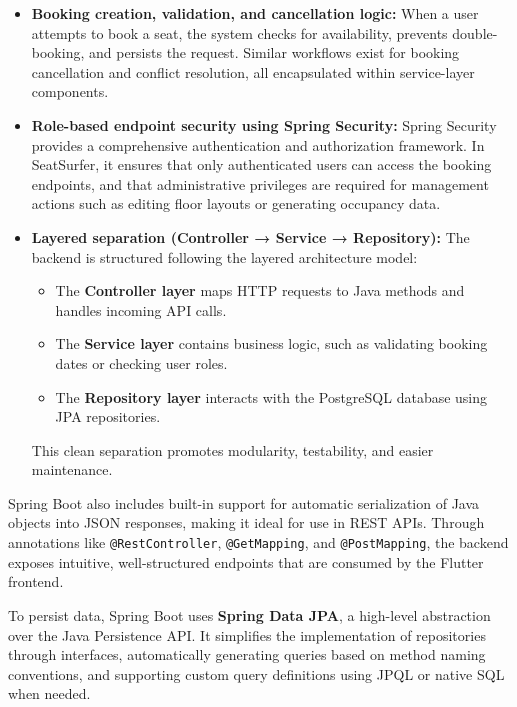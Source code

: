 \documentclass[12pt,a4paper]{report}
\begin{document}
\begin{itemize}
    \item \textbf{Booking creation, validation, and cancellation logic:} When a user attempts to book a seat, the system checks for availability, prevents double-booking, and persists the request. Similar workflows exist for booking cancellation and conflict resolution, all encapsulated within service-layer components.

    \item \textbf{Role-based endpoint security using Spring Security:} Spring Security provides a comprehensive authentication and authorization framework. In SeatSurfer, it ensures that only authenticated users can access the booking endpoints, and that administrative privileges are required for management actions such as editing floor layouts or generating occupancy data.

    \item \textbf{Layered separation (Controller → Service → Repository):} The backend is structured following the layered architecture model:
    \begin{itemize}
        \item The \textbf{Controller layer} maps HTTP requests to Java methods and handles incoming API calls.
        \item The \textbf{Service layer} contains business logic, such as validating booking dates or checking user roles.
        \item The \textbf{Repository layer} interacts with the PostgreSQL database using JPA repositories.
    \end{itemize}
    This clean separation promotes modularity, testability, and easier maintenance.
\end{itemize}

Spring Boot also includes built-in support for automatic serialization of Java objects into JSON responses, making it ideal for use in REST APIs. Through annotations like \texttt{@RestController}, \texttt{@GetMapping}, and \texttt{@PostMapping}, the backend exposes intuitive, well-structured endpoints that are consumed by the Flutter frontend.

To persist data, Spring Boot uses \textbf{Spring Data JPA}, a high-level abstraction over the Java Persistence API. It simplifies the implementation of repositories through interfaces, automatically generating queries based on method naming conventions, and supporting custom query definitions using JPQL or native SQL when needed.
\end{document}
